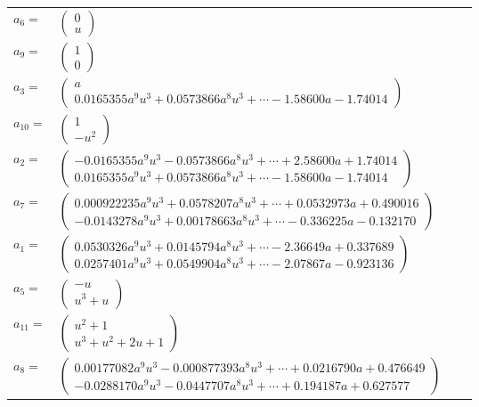 \documentclass[1p]{elsarticle_modified}
\theoremstyle{definition}
\begin{document}
\begin{tabular}{m{7pt} m{180pt} m{7pt} m{180pt} }
\flushright $a_{6}=$&$\begin{pmatrix}0\\u\end{pmatrix}$ \\
\flushright $a_{9}=$&$\begin{pmatrix}1\\0\end{pmatrix}$ \\
\flushright $a_{3}=$&$\begin{pmatrix}a\\0.0165355 a^{9} u^{3}+0.0573866 a^{8} u^{3}+\cdots-1.58600 a-1.74014\end{pmatrix}$ \\
\flushright $a_{10}=$&$\begin{pmatrix}1\\- u^2\end{pmatrix}$ \\
\flushright $a_{2}=$&$\begin{pmatrix}-0.0165355 a^{9} u^{3}-0.0573866 a^{8} u^{3}+\cdots+2.58600 a+1.74014\\0.0165355 a^{9} u^{3}+0.0573866 a^{8} u^{3}+\cdots-1.58600 a-1.74014\end{pmatrix}$ \\
\flushright $a_{7}=$&$\begin{pmatrix}0.000922235 a^{9} u^{3}+0.0578207 a^{8} u^{3}+\cdots+0.0532973 a+0.490016\\-0.0143278 a^{9} u^{3}+0.00178663 a^{8} u^{3}+\cdots-0.336225 a-0.132170\end{pmatrix}$ \\
\flushright $a_{1}=$&$\begin{pmatrix}0.0530326 a^{9} u^{3}+0.0145794 a^{8} u^{3}+\cdots-2.36649 a+0.337689\\0.0257401 a^{9} u^{3}+0.0549904 a^{8} u^{3}+\cdots-2.07867 a-0.923136\end{pmatrix}$ \\
\flushright $a_{5}=$&$\begin{pmatrix}- u\\u^3+u\end{pmatrix}$ \\
\flushright $a_{11}=$&$\begin{pmatrix}u^2+1\\u^3+u^2+2 u+1\end{pmatrix}$ \\
\flushright $a_{8}=$&$\begin{pmatrix}0.00177082 a^{9} u^{3}-0.000877393 a^{8} u^{3}+\cdots+0.0216790 a+0.476649\\-0.0288170 a^{9} u^{3}-0.0447707 a^{8} u^{3}+\cdots+0.194187 a+0.627577\end{pmatrix}$ \\

\end{tabular}
\end{document}
